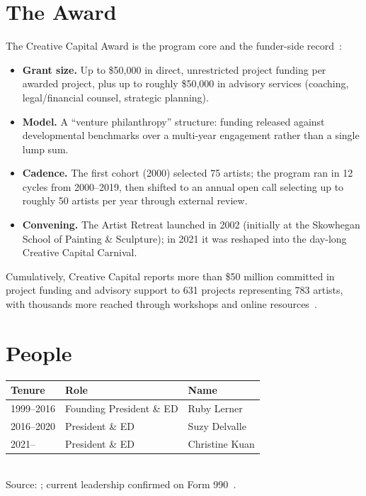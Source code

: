 \documentclass[10pt,letterpaper,twocolumn]{article}
\begin{document}
\section{The Award}

The Creative Capital Award is the program core and the funder-side record~\citep{cchistory,ccwiki}:

\begin{itemize}
\item \textbf{Grant size.} Up to \$50,000 in direct, unrestricted project funding per awarded project, plus up to roughly \$50,000 in advisory services (coaching, legal/financial counsel, strategic planning).
\item \textbf{Model.} A ``venture philanthropy'' structure: funding released against developmental benchmarks over a multi-year engagement rather than a single lump sum.
\item \textbf{Cadence.} The first cohort (2000) selected 75 artists; the program ran in 12 cycles from 2000--2019, then shifted to an annual open call selecting up to roughly 50 artists per year through external review.
\item \textbf{Convening.} The Artist Retreat launched in 2002 (initially at the Skowhegan School of Painting \& Sculpture); in 2021 it was reshaped into the day-long Creative Capital Carnival.
\end{itemize}

Cumulatively, Creative Capital reports more than \$50 million committed in project funding and advisory support to 631 projects representing 783 artists, with thousands more reached through workshops and online resources~\citep{cchistory}.

\section{People}

\begin{table}[h]
\footnotesize
\centering
\setlength{\tabcolsep}{3pt}
\begin{tabularx}{\columnwidth}{lXX}
\toprule
\textbf{Tenure} & \textbf{Role} & \textbf{Name} \\
\midrule
1999--2016 & Founding President \& ED & Ruby Lerner \\
2016--2020 & President \& ED & Suzy Delvalle \\
2021-- & President \& ED & Christine Kuan \\
\bottomrule
\end{tabularx}
\\[0.3em]
\footnotesize Source: \citet{ccwiki,cchistory}; current leadership confirmed on Form 990~\citep{ccpropublica}.
\end{table}
\end{document}
